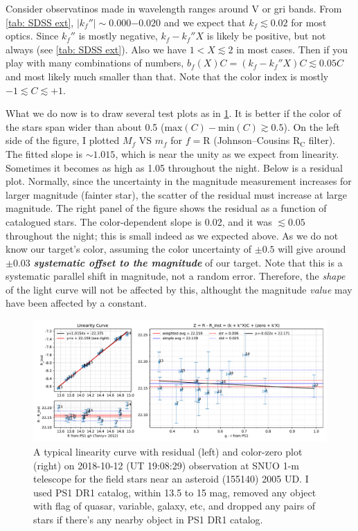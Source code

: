 \begin{ex}
  Consider observatinos made in wavelength ranges around V or gri bands. From \cref{tab: SDSS ext}, $ |k_f''| \sim 0.000 \mathrm{-} 0.020 $ and we expect that $ k_f \lesssim 0.02 $ for most optics. Since $ k_f'' $ is mostly negative, $ k_f - k_f'' X $ is likely be positive, but not always (see \cref{tab: SDSS ext}). Also we have $ 1 < X \lesssim 2 $ in most cases. Then if you play with many combinations of numbers, $ b_f(X) C = (k_f - k_f'' X) C \lesssim 0.05 C $ and most likely much smaller than that. Note that the color index is mostly $ -1 \lesssim C \lesssim +1 $.
\end{ex}

What we do now is to draw several test plots as in \cref{fig:zeropt}. It is better if the color of the stars span wider than about 0.5 ($ \mathrm{max}(C) - \mathrm{min} (C) \gtrsim 0.5 $). On the left side of the figure, I plotted $ M_f $ VS $ m_f $ for $ f = \mathrm{R} $ (Johnson--Cousins $ \mathrm{R_C} $ filter). The fitted slope is $ \sim 1.015 $, which is near the unity as we expect from linearity. Sometimes it becomes as high as 1.05 throughout the night. Below is a residual plot. Normally, since the uncertainty in the magnitude measurement increases for larger magnitude (fainter star), the scatter of the residual must increase at large magnitude. The right panel of the figure shows the residual as a function of catalogued stars. The color-dependent slope is 0.02, and it was $ \lesssim 0.05 $ throughout the night; this is small indeed as we expected above. As we do not know our target's color, assuming the color uncertainty of $ \pm 0.5 $ will give around $ \pm 0.03 $ \textbf{\emph{systematic offset to the magnitude}} of our target. Note that this is a systematic parallel shift in magnitude, not a random error. Therefore, the \emph{shape} of the light curve will not be affected by this, althought the magnitude \emph{value} may have been affected by a constant.

\begin{figure}[ht!]
\centering
\includegraphics[width=\linewidth]{figs/SNUO_STX16803-2005UD-1-1-20181012-190829_zeropoint.pdf}
\caption{A typical linearity curve with residual (left) and color-zero plot (right) on 2018-10-12 (UT 19:08:29) observation at SNUO 1-m telescope for the field stars near an asteroid (155140) 2005 UD. I used PS1 DR1 catalog, within 13.5 to 15 mag, removed any object with flag of quasar, variable, galaxy, etc, and dropped any pairs of stars if there's any nearby object in PS1 DR1 catalog.}
\label{fig:zeropt}
\end{figure}

